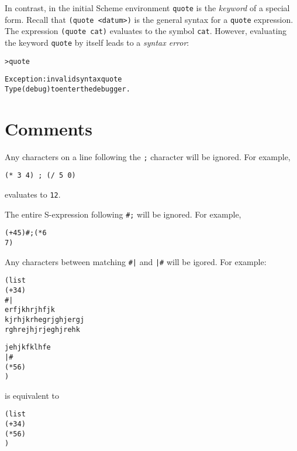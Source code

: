 \documentclass{book}
\begin{document}
In contrast, in the initial Scheme environment \verb|quote| is the \emph{keyword} of a special form.  Recall that \verb|(quote <datum>)| is the general syntax for a \verb|quote| expression.  The expression \verb|(quote cat)| evaluates to the symbol \verb|cat|.  However, evaluating the keyword \verb|quote| by itself leads to a \emph{syntax error}:

\begin{alltt}
> quote

Exception: invalid syntax quote
Type (debug) to enter the debugger.
\end{alltt}


\section{Comments}


Any characters on a line following the \verb|;| character will be ignored.  For example,

\verb|(* 3 4) ; (/ 5 0)|

\noindent
evaluates to \verb|12|.

The entire S-expression following \verb|#;| will be ignored.  For example,

\begin{alltt}
(+ 4 5) #;(* 6
             7)
\end{alltt}
  
Any characters between matching \texttt{\#|} and \texttt{|\#} will be igored.  For example:

                                        
\begin{alltt}
(list
  (+ 3 4)
  #|
  erfjkhrj hfjk
  kjrhjkrheg rjghjer gj
  rghrejhj rjegh jrehk
  
  jehjkf klh fe
  |#
  (* 5 6)
  )
\end{alltt}

\noindent
is equivalent to

\begin{alltt}
(list
  (+ 3 4)
  (* 5 6)
  )
\end{alltt}
\end{document}
